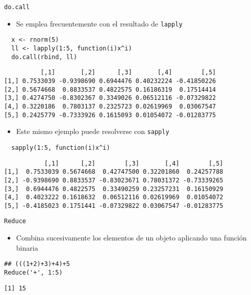 \documentclass[xcolor={usenames,svgnames,dvipsnames}]{beamer}
\begin{document}
\begin{frame}[fragile,label={sec:orgf68dc68}]{\texttt{do.call}}
 \begin{itemize}
\item Se emplea frecuentemente con el resultado de \texttt{lapply}
\end{itemize}
\lstset{language=r,label= ,caption= ,captionpos=b,numbers=none}
\begin{lstlisting}
  x <- rnorm(5)
  ll <- lapply(1:5, function(i)x^i)
  do.call(rbind, ll)
\end{lstlisting}

\begin{verbatim}
          [,1]       [,2]      [,3]       [,4]        [,5]
[1,] 0.7533039 -0.9398690 0.6944476 0.40232224 -0.41850226
[2,] 0.5674668  0.8833537 0.4822575 0.16186319  0.17514414
[3,] 0.4274750 -0.8302367 0.3349026 0.06512116 -0.07329822
[4,] 0.3220186  0.7803137 0.2325723 0.02619969  0.03067547
[5,] 0.2425779 -0.7333926 0.1615093 0.01054072 -0.01283775
\end{verbatim}

\begin{itemize}
\item Este mismo ejemplo puede resolverse con \texttt{sapply}
\end{itemize}
\lstset{language=r,label= ,caption= ,captionpos=b,numbers=none}
\begin{lstlisting}
  sapply(1:5, function(i)x^i)
\end{lstlisting}

\begin{verbatim}
           [,1]      [,2]        [,3]       [,4]        [,5]
[1,]  0.7533039 0.5674668  0.42747500 0.32201860  0.24257788
[2,] -0.9398690 0.8833537 -0.83023671 0.78031372 -0.73339265
[3,]  0.6944476 0.4822575  0.33490259 0.23257231  0.16150929
[4,]  0.4023222 0.1618632  0.06512116 0.02619969  0.01054072
[5,] -0.4185023 0.1751441 -0.07329822 0.03067547 -0.01283775
\end{verbatim}
\end{frame}

\begin{frame}[fragile,label={sec:org1376570}]{\texttt{Reduce}}
 \begin{itemize}
\item Combina sucesivamente los elementos de un objeto aplicando una
función binaria
\end{itemize}
\lstset{language=r,label= ,caption= ,captionpos=b,numbers=none}
\begin{lstlisting}
## (((1+2)+3)+4)+5
Reduce('+', 1:5)
\end{lstlisting}

\begin{verbatim}
[1] 15
\end{verbatim}
\end{frame}
\end{document}
